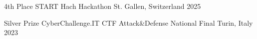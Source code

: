 

\begin{cvhonors}

	\cvhonor
	{4th Place} %
	{START Hach Hackathon} %
	{St. Gallen, Switzerland} %
	{2025} %


	\cvhonor
	{Silver Prize} %
	{CyberChallenge.IT CTF Attack\&Defense National Final} %
	{Turin, Italy} %
	{2023} %

\end{cvhonors}
